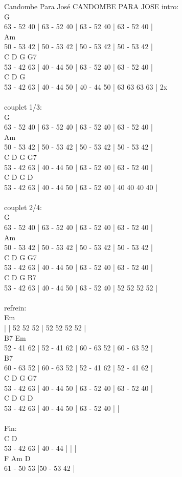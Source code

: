 \begin{song}[candombe]{Candombe Para José}
CANDOMBE PARA JOSE
intro:\\
G\\
63 - 52 40 | 63 - 52 40 | 63 - 52 40 | 63 - 52 40 | \\
Am\\
50 - 53 42 | 50 - 53 42 | 50 - 53 42 | 50 - 53 42 |\\
C D G G7\\
53 - 42 63 | 40 - 44 50 | 63 - 52 40 | 63 - 52 40 |\\
C D G\\
53 - 42 63 | 40 - 44 50 | 40 - 44 50 | 63 63 63 63 | 2x \\\\
couplet 1/3:\\
G\\
63 - 52 40 | 63 - 52 40 | 63 - 52 40 | 63 - 52 40 |\\
Am\\
50 - 53 42 | 50 - 53 42 | 50 - 53 42 | 50 - 53 42 |\\
C D G G7\\
53 - 42 63 | 40 - 44 50 | 63 - 52 40 | 63 - 52 40 |\\
C D G D\\
53 - 42 63 | 40 - 44 50 | 63 - 52 40 | 40 40 40 40 |\\\\
couplet 2/4:\\
G\\
63 - 52 40 | 63 - 52 40 | 63 - 52 40 | 63 - 52 40 |\\
Am\\
50 - 53 42 | 50 - 53 42 | 50 - 53 42 | 50 - 53 42 |\\
C D G G7\\
53 - 42 63 | 40 - 44 50 | 63 - 52 40 | 63 - 52 40 |\\
C D G B7\\
53 - 42 63 | 40 - 44 50 | 63 - 52 40 | 52 52 52 52 |\\\\
refrein:\\
Em\\
 | | 52 52 52 | 52 52 52 52 |\\
B7 Em\\
52 - 41 62 | 52 - 41 62 | 60 - 63 52 | 60 - 63 52 |\\
B7\\
60 - 63 52 | 60 - 63 52 | 52 - 41 62 | 52 - 41 62 |\\
C D G G7\\
53 - 42 63 | 40 - 44 50 | 63 - 52 40 | 63 - 52 40 |\\
C D G D\\
53 - 42 63 | 40 - 44 50 | 63 - 52 40 | |\\\\
Fin:\\
C D\\
53 - 42 63 | 40 - 44 | | |\\
F Am D\\
61 - 50 53 |50 - 53 42 | \\
\end{song}

